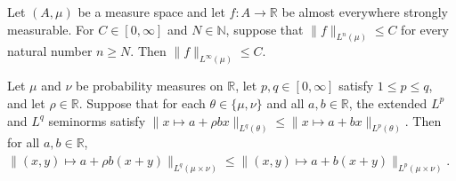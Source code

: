 \begin{theorem}
\leanok
{}
Let $(A,\mu)$ be a measure space and let $f:A\to\mathbb R$ be almost everywhere strongly
measurable. For $C\in[0,\infty]$ and $N\in\mathbb N$, suppose that $\|f\|_{L^n(\mu)}\le
C$ for every natural number $n\ge N$. Then $\|f\|_{L^\infty(\mu)}\le C$.
\end{theorem}

\begin{theorem}
\leanok
{}
Let $\mu$ and $\nu$ be probability measures on $\mathbb R$, let $p,q\in[0,\infty]$
satisfy $1\le p\le q$, and let $\rho\in\mathbb R$. Suppose that for each
$\theta\in\{\mu,\nu\}$ and all $a,b\in\mathbb R$, the extended $L^p$ and $L^q$ seminorms
satisfy $\|x\mapsto a+\rho bx\|_{L^q(\theta)}\le\|x\mapsto a+bx\|_{L^p(\theta)}$. Then
for all $a,b\in\mathbb R$, $\| (x,y)\mapsto a+\rho
b(x+y)\|_{L^q(\mu\times\nu)}\le\|(x,y)\mapsto a+b(x+y)\|_{L^p(\mu\times\nu)}$.
\end{theorem}
